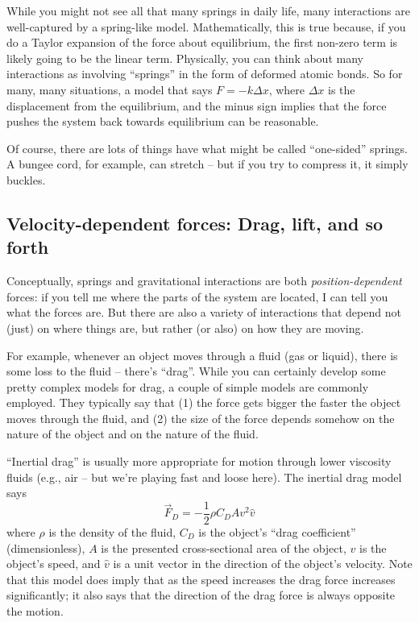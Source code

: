 \documentclass{tufte-handout}
\begin{document}
While you might not see all that many springs in daily life, many interactions are well-captured by a spring-like model.  Mathematically, this is true because, if you do a Taylor expansion of the force about equilibrium, the first non-zero term is likely going to be the linear term.  Physically, you can think about many interactions as involving ``springs'' in the form of deformed atomic bonds.  So for many, many situations, a model that says $F=-k\Delta x$, where $\Delta x$ is the displacement from the equilibrium, and the minus sign implies that the force pushes the system back towards equilibrium can be reasonable.

Of course, there are lots of things have what might be called ``one-sided'' springs.  A bungee cord, for example, can stretch -- but if you try to compress it, it simply buckles. 

\subsection{Velocity-dependent forces: Drag, lift, and so forth}
Conceptually, springs and gravitational interactions are both {\it position-dependent} forces:  if you tell me where the parts of the system are located, I can tell you what the forces are.  But there are also a variety of interactions that depend not (just) on where things are, but rather (or also) on how they are moving.

For example, whenever an object moves through a fluid (gas or liquid), there is some loss to the fluid -- there's ``drag''.   While you can certainly develop some pretty complex models for drag, a couple of simple models are commonly employed.  They typically say that (1) the force gets bigger the faster the object moves through the fluid, and (2) the size of the force depends somehow on the nature of the object and on the nature of the fluid.

``Inertial drag'' is usually more appropriate for motion through lower viscosity fluids (e.g., air -- but we're playing fast and loose here).  The inertial drag model says 
$$\vec{F}_{D} = -\frac{1}{2} \rho C_D A v^2 \hat{v}$$
where $\rho$ is the density of the fluid, $C_D$ is the object's ``drag coefficient'' (dimensionless), $A$ is the presented cross-sectional area of the object, $v$ is the object's speed, and $\hat{v}$ is a unit vector in the direction of the object's velocity.  Note that this model does imply that as the speed increases the drag force increases significantly; it also says that the direction of the drag force is always opposite the motion.
\end{document}
